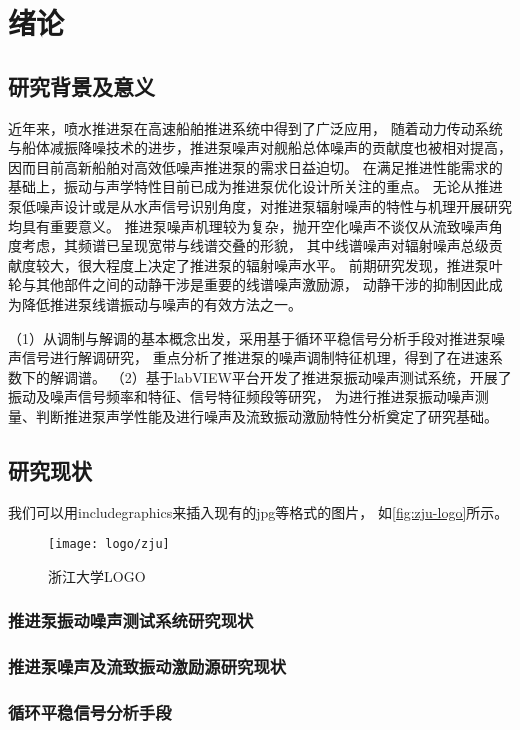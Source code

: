 \chapter{绪论}

\section{研究背景及意义}

近年来，喷水推进泵在高速船舶推进系统中得到了广泛应用，
随着动力传动系统与船体减振降噪技术的进步，推进泵噪声对舰船总体噪声的贡献度也被相对提高，
因而目前高新船舶对高效低噪声推进泵的需求日益迫切。
在满足推进性能需求的基础上，振动与声学特性目前已成为推进泵优化设计所关注的重点。
无论从推进泵低噪声设计或是从水声信号识别角度，对推进泵辐射噪声的特性与机理开展研究均具有重要意义。
推进泵噪声机理较为复杂，抛开空化噪声不谈仅从流致噪声角度考虑，其频谱已呈现宽带与线谱交叠的形貌，
其中线谱噪声对辐射噪声总级贡献度较大，很大程度上决定了推进泵的辐射噪声水平。
前期研究发现，推进泵叶轮与其他部件之间的动静干涉是重要的线谱噪声激励源，
动静干涉的抑制因此成为降低推进泵线谱振动与噪声的有效方法之一。

（1）从调制与解调的基本概念出发，采用基于循环平稳信号分析手段对推进泵噪声信号进行解调研究，
重点分析了推进泵的噪声调制特征机理，得到了在进速系数下的解调谱。
（2）基于labVIEW平台开发了推进泵振动噪声测试系统，开展了振动及噪声信号频率和特征、信号特征频段等研究，
为进行推进泵振动噪声测量、判断推进泵声学性能及进行噪声及流致振动激励特性分析奠定了研究基础。 


\section{研究现状}

我们可以用includegraphics来插入现有的jpg等格式的图片，
如\autoref{fig:zju-logo}所示。

\begin{figure}[htbp]
    \centering
    \texttt{[image: logo/zju]}
    \caption{\label{fig:zju-logo}浙江大学LOGO}
\end{figure}


\subsection{推进泵振动噪声测试系统研究现状}
\subsection{推进泵噪声及流致振动激励源研究现状}
\subsection{循环平稳信号分析手段}


